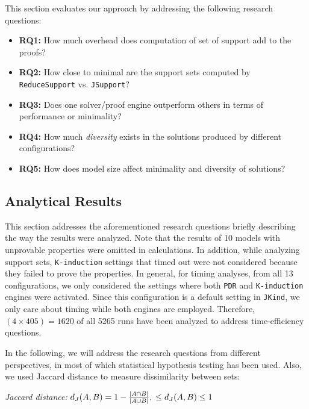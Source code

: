 This section evaluates our approach by addressing the following research questions:

\begin{itemize}
    \item \textbf{RQ1:} How much overhead does computation of set of support add to the proofs?
    \item \textbf{RQ2:} How close to minimal are the support sets computed by \texttt{ReduceSupport} vs. \texttt{JSupport}?
    \item \textbf{RQ3:} Does one solver/proof engine outperform others in terms of performance or minimality?
    \item \textbf{RQ4:} How much {\em diversity} exists in the solutions produced by different configurations?
    \item \textbf{RQ5:} How does model size affect minimality and diversity of solutions?
\end{itemize}

\subsection{Analytical Results}
\label{sec:res}
This section addresses the aforementioned research questions briefly describing the way the results were analyzed. Note that the results of 10 models with unprovable properties were omitted in calculations. In addition, while analyzing support sets, \texttt{K-induction} settings that timed out were not considered because they failed to prove the properties.
In general, for timing analyses, from all 13 configurations, we only considered the settings where both \texttt{PDR} and \texttt{K-induction} engines were activated. Since this configuration is a default setting in \texttt{JKind}, we only care about timing while both engines are employed. Therefore, $(4 \times 405) = 1620$ of all 5265 runs have been analyzed to address time-efficiency questions.

In the following, we will address the research questions from different perspectives, in most of which statistical hypothesis testing \cite{lehmann1986testing} has been used. Also, we used Jaccard distance to measure dissimilarity between sets:
\begin{definition}{\emph{Jaccard distance:}}
  \label{def:dj}
  $d_J(\small{A}, \small{B}) = 1 - \frac{|A \cap B|}{|A \cup B|} ,\\ \leq d_J(\small{A}, \small{B}) \leq 1$
\end{definition}


